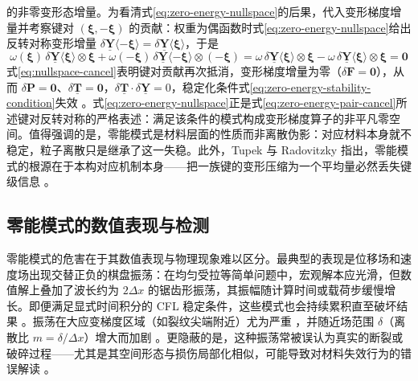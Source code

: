 的非零变形态增量。为看清式\eqref{eq:zero-energy-nullspace}的后果，代入变形梯度增量并考察键对 $(\boldsymbol{\xi},-\boldsymbol{\xi})$ 的贡献：权重为偶函数时式\eqref{eq:zero-energy-nullspace}给出反转对称变形增量 $\delta\underline{\mathbf{Y}}\langle-\boldsymbol{\xi}\rangle=\delta\underline{\mathbf{Y}}\langle\boldsymbol{\xi}\rangle$，于是
\begin{equation}
  \omega(\boldsymbol{\xi})\,\delta\underline{\mathbf{Y}}\langle\boldsymbol{\xi}\rangle\otimes\boldsymbol{\xi}
  +\omega(-\boldsymbol{\xi})\,\delta\underline{\mathbf{Y}}\langle-\boldsymbol{\xi}\rangle\otimes(-\boldsymbol{\xi})
  =\omega\,\delta\underline{\mathbf{Y}}\langle\boldsymbol{\xi}\rangle\otimes\boldsymbol{\xi}
  -\omega\,\delta\underline{\mathbf{Y}}\langle\boldsymbol{\xi}\rangle\otimes\boldsymbol{\xi}
  =\mathbf{0}
  \label{eq:nullspace-cancel}
\end{equation}
式\eqref{eq:nullspace-cancel}表明键对贡献再次抵消，变形梯度增量为零（$\delta\mathbf{F}=\mathbf{0}$），从而 $\delta\mathbf{P}=\mathbf{0}$、$\delta\underline{\mathbf{T}}=\mathbf{0}$，$\delta\underline{\mathbf{T}}\cdot\delta\underline{\mathbf{Y}}=0$，稳定化条件式\eqref{eq:zero-energy-stability-condition}失效 \cite{Silling2017}。式\eqref{eq:zero-energy-nullspace}正是式\eqref{eq:zero-energy-pair-cancel}所述键对反转对称的严格表述：满足该条件的模式构成变形梯度算子的非平凡零空间。值得强调的是，零能模式是材料层面的性质而非离散伪影：对应材料本身就不稳定，粒子离散只是继承了这一失稳。此外，Tupek 与 Radovitzky 指出，零能模式的根源在于本构对应机制本身——把一族键的变形压缩为一个平均量必然丢失键级信息 \cite{TupekRadovitzky2014}。

\subsection{零能模式的数值表现与检测}\label{sec:zero-energy-detect}

零能模式的危害在于其数值表现与物理现象难以区分。最典型的表现是位移场和速度场出现交替正负的棋盘振荡：在均匀受拉等简单问题中，宏观解本应光滑，但数值解上叠加了波长约为 $2\Delta x$ 的锯齿形振荡，其振幅随计算时间或载荷步缓慢增长。即便满足显式时间积分的 CFL 稳定条件，这些模式也会持续累积直至破坏结果 \cite{Silling2017}。振荡在大应变梯度区域（如裂纹尖端附近）尤为严重 \cite{Breitenfeld2014}，并随近场范围 $\delta$（离散比 $m=\delta/\Delta x$）增大而加剧 \cite{Chowdhury2019}。更隐蔽的是，这种振荡常被误认为真实的断裂或破碎过程——尤其是其空间形态与损伤局部化相似，可能导致对材料失效行为的错误解读 \cite{GuZhang2019}。

